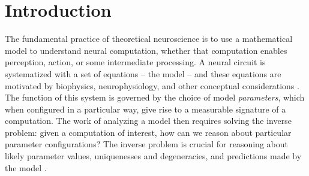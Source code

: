 \documentclass[11pt]{article}
\begin{document}


\section{Introduction}
The fundamental practice of theoretical neuroscience is to use a mathematical model to understand neural computation, whether that computation enables perception, action, or some intermediate processing.  
A neural circuit is systematized with a set of equations -- the model -- and these equations are motivated by biophysics, neurophysiology, and other conceptual considerations \cite{kopell1988coupled,  marder1998biophysics, abbott2008theoretical, wang2010neurophysiological}.
The function of this system is governed by the choice of model \emph{parameters}, which when configured in a particular way, give rise to a measurable signature of a computation.   
The work of analyzing a model then requires solving the inverse problem: given a computation of interest, how can we reason about particular parameter configurations?  
The inverse problem is crucial for reasoning about likely parameter values, uniquenesses and degeneracies, and predictions made by the model \cite{gutenkunst2007universally, o2014cell}.
\end{document}

